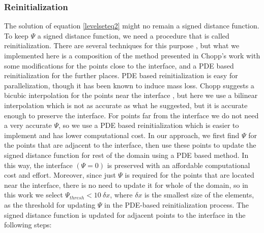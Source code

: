 \documentclass[review]{elsarticle}
\begin{document}
\subsubsection{Reinitialization} \label{reinitialization}
The solution of equation \eqref{levelseteq2} might no remain a signed distance function. To keep $\varPsi$ a signed distance function, we need a procedure that is called 
reinitialization. There are several techniques for this purpose \cite{Osher1988}, but what we implemented here is a composition of the method presented in Chopp's work \cite{Chopp2001} with 
some modifications for the points close to the interface, and a PDE based reinitialization for the further places\cite{Sussman1994a}.
PDE based reinitialization is easy for parallelization, though it has been known to induce mass loss. Chopp suggests a bicubic interpolation for the points near the interface \cite{Chopp2001},
but here we use a bilinear interpolation which is not as accurate as what he suggested, but it is accurate enough to preserve the interface. 
For points far from the interface we do not need a very accurate $\varPsi$, so we use a PDE based reinitialization which is easier to implement and has lower computational cost. 
In our approach, we first find $\varPsi$ for the points that are adjacent to the interface, then use these points to update the signed distance function for rest of the domain using a PDE based method.
In this way, the interface $( \varPsi=0 )$ is preserved with an affordable computational cost and effort. Moreover, since just $\varPsi$ is required for the points that are located near the interface, 
there is no need to update it for whole of the domain, so in this work we select $\varPsi_{thresh}<10\ \delta x$, where $\delta x$ is the smallest size of the elements, 
as the threshold for updating $\varPsi$ in the PDE-based reinitialization process.
The signed distance function is updated for adjacent points to the interface in the following steps:
\end{document}
